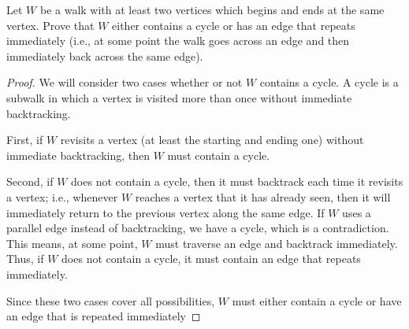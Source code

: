 \documentclass[../hw4]{subfiles}
\begin{document}
\begin{problem}
Let $W$ be a walk with at least two vertices which begins and ends at the same vertex. Prove that $W$ either contains a cycle or has an edge that repeats immediately (i.e., at some point the walk goes across an edge and then immediately back across the same edge).
\end{problem}
\begin{proof}
	We will consider two cases whether or not $W$ contains a cycle.
	A cycle is a subwalk in which a vertex is visited more than once without immediate backtracking.

	First, if $W$ revisits a vertex (at least the starting and ending one) without immediate backtracking,
	then $W$ must contain a cycle.

	Second, if $W$ does not contain a cycle, then it must backtrack each time it revisits a vertex;
	i.e., whenever  $W$ reaches a vertex that it has already seen, then it will immediately return to the previous vertex along the same edge.
	If  $W$ uses a parallel edge instead of backtracking, we have a cycle, which is a contradiction.
	This means, at some point,  $W$ must traverse an edge and backtrack immediately.
	Thus, if $W$ does not contain a cycle, it must contain an edge that repeats immediately.

	Since these two cases cover all possibilities, $W$ must either contain a cycle or have an edge that is repeated immediately
\end{proof}
\end{document}

